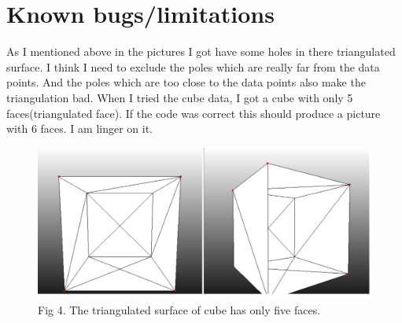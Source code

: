 \documentclass[11pt]{article}
\begin{document}
\section{Known bugs/limitations}
As I mentioned above in the pictures I got have some holes in there triangulated surface. I think I need to exclude the poles which are really far from the data points. And the poles which are too close to the data points also make the triangulation bad. When I tried the cube data, I got a cube with only 5 faces(triangulated face). If the code was correct this should produce a picture with 6 faces. I am linger on it.  

\begin{figure}[h]
  \includegraphics[width=120mm]{crust_cube.jpg}\\
  Fig 4. The triangulated surface of cube has only five faces. 
\end{figure}



\end{document}

